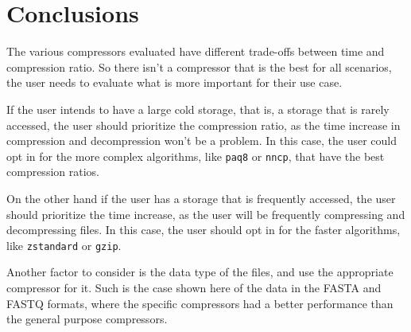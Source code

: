 \section{Conclusions}

    The various compressors evaluated have different trade-offs between time and compression ratio. So there isn't a compressor that is the best for all scenarios, the user needs to evaluate what is more important for their use case.
    
    If the user intends to have a large cold storage, that is, a storage that is rarely accessed, the user should prioritize the compression ratio, as the time increase in compression and decompression won't be a problem. In this case, the user could opt in for the more complex algorithms, like \texttt{paq8} or \texttt{nncp}, that have the best compression ratios. 
    
    On the other hand if the user has a storage that is frequently accessed, the user should prioritize the time increase, as the user will be frequently compressing and decompressing files. In this case, the user should opt in for the faster algorithms, like \texttt{zstandard} or \texttt{gzip}. 

    Another factor to consider is the data type of the files, and use the appropriate compressor for it. Such is the case shown here of the data in the FASTA and FASTQ formats, where the specific compressors had a better performance than the general purpose compressors. 

